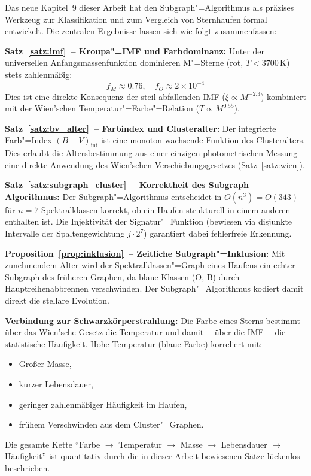 ﻿\documentclass[a4paper,12pt]{article}
\theoremstyle{definition}
\begin{document}
Das neue Kapitel~9 dieser Arbeit hat den Subgraph"=Algorithmus als
präzises Werkzeug zur Klassifikation und zum Vergleich von Sternhaufen
formal entwickelt. Die zentralen Ergebnisse lassen sich wie folgt
zusammenfassen:

\textbf{Satz~\ref{satz:imf}~-- Kroupa"=IMF und Farbdominanz:}
Unter der universellen Anfangsmassenfunktion dominieren M"=Sterne
(rot, $T < 3700\,\text{K}$) stets zahlenmäßig:
\[
    f_M \approx 0.76, \quad f_O \approx 2 \times 10^{-4}
\]
Dies ist eine direkte Konsequenz der steil abfallenden IMF
($\xi \propto M^{-2.3}$) kombiniert mit der Wien'schen
Temperatur"=Farbe"=Relation ($T \propto M^{0.55}$).

\textbf{Satz~\ref{satz:bv_alter}~-- Farbindex und Clusteralter:}
Der integrierte Farb"=Index $(B-V)_{\text{int}}$ ist eine monoton
wachsende Funktion des Clusteralters. Dies erlaubt die Altersbestimmung
aus einer einzigen photometrischen Messung -- eine direkte Anwendung
des Wien'schen Verschiebungsgesetzes (Satz~\ref{satz:wien}).

\textbf{Satz~\ref{satz:subgraph_cluster}~-- Korrektheit des Subgraph Algorithmus:}
Der Subgraph"=Algorithmus entscheidet in $O(n^3) = O(343)$ für $n = 7$
Spektralklassen korrekt, ob ein Haufen strukturell in einem anderen
enthalten ist. Die Injektivität der Signatur"=Funktion (bewiesen via
disjunkte Intervalle der Spaltengewichtung $j \cdot 2^7$) garantiert
dabei fehlerfreie Erkennung.

\textbf{Proposition~\ref{prop:inklusion}~-- Zeitliche Subgraph"=Inklusion:}
Mit zunehmendem Alter wird der Spektralklassen"=Graph eines Haufens
ein echter Subgraph des früheren Graphen, da blaue Klassen (O, B)
durch Hauptreihenabbrennen verschwinden. Der Subgraph"=Algorithmus
kodiert damit direkt die stellare Evolution.

\textbf{Verbindung zur Schwarzkörperstrahlung:}
Die Farbe eines Sterns bestimmt über das Wien'sche Gesetz die
Temperatur und damit~-- über die IMF~-- die statistische Häufigkeit.
Hohe Temperatur (blaue Farbe) korreliert mit:
\begin{itemize}
    \item Großer Masse,
    \item kurzer Lebensdauer,
    \item geringer zahlenmäßiger Häufigkeit im Haufen,
    \item frühem Verschwinden aus dem Cluster"=Graphen.
\end{itemize}
Die gesamte Kette ``Farbe $\to$ Temperatur $\to$ Masse $\to$ Lebensdauer
$\to$ Häufigkeit'' ist quantitativ durch die in dieser Arbeit bewiesenen
Sätze lückenlos beschrieben.
\end{document}
